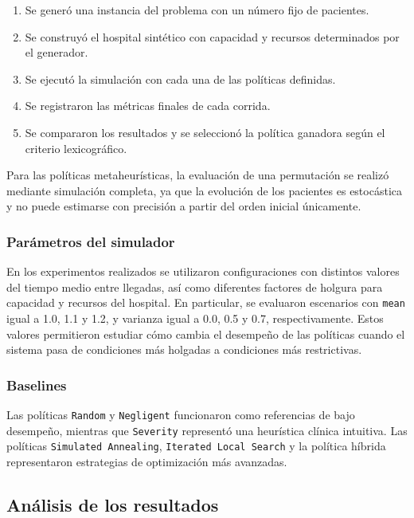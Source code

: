 \documentclass[12pt,a4paper]{article}
\begin{document}
\begin{enumerate}
    \item Se generó una instancia del problema con un número fijo de pacientes.
    \item Se construyó el hospital sintético con capacidad y recursos determinados por el generador.
    \item Se ejecutó la simulación con cada una de las políticas definidas.
    \item Se registraron las métricas finales de cada corrida.
    \item Se compararon los resultados y se seleccionó la política ganadora según el criterio lexicográfico.
\end{enumerate}

Para las políticas metaheurísticas, la evaluación de una permutación se realizó mediante simulación completa, 
ya que la evolución de los pacientes es estocástica y no puede estimarse con precisión a partir del orden inicial únicamente.

\subsubsection{Parámetros del simulador}

En los experimentos realizados se utilizaron configuraciones con distintos valores del tiempo medio entre llegadas, 
así como diferentes factores de holgura para capacidad y recursos del hospital. 
En particular, se evaluaron escenarios con \texttt{mean} igual a 1.0, 1.1 y 1.2, y varianza igual a 0.0, 0.5 y 0.7, respectivamente. 
Estos valores permitieron estudiar cómo cambia el desempeño de las políticas cuando el sistema pasa de condiciones más holgadas a condiciones más restrictivas.

\subsubsection{Baselines}

Las políticas \texttt{Random} y \texttt{Negligent} funcionaron como referencias de bajo desempeño, 
mientras que \texttt{Severity} representó una heurística clínica intuitiva. 
Las políticas \texttt{Simulated Annealing}, \texttt{Iterated Local Search} y la política híbrida representaron estrategias 
de optimización más avanzadas.

\subsection{Análisis de los resultados}
\end{document}
